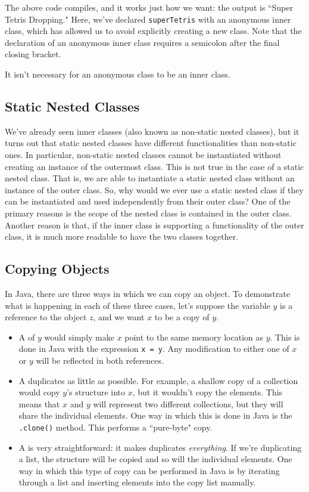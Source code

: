 The above code compiles, and it works just how we want: the output is ``Super Tetris Dropping." Here, we've declared \verb!superTetris! with an anonymous inner class, which has allowed us to avoid explicitly creating a new class. Note that the declaration of an anonymous inner class requires a semicolon after the final closing bracket. 

It isn't necessary for an anonymous class to be an inner class.

\subsection{Static Nested Classes}

We've already seen inner classes (also known as non-static nested classes), but it turns out that static nested classes have different functionalities than non-static ones. In particular, non-static nested classes cannot be instantiated without creating an instance of the outermost class. This is not true in the case of a static nested class. That is, we are able to instantiate a static nested class without an instance of the outer class. So, why would we ever use a static nested class if they can be instantiated and used independently from their outer class? One of the primary reasons is the scope of the nested class is contained in the outer class. Another reason is that, if the inner class is supporting a functionality of the outer class, it is much more readable to have the two classes together. 

\subsection{Copying Objects}
In Java, there are three ways in which we can copy an object. To demonstrate what is happening in each of these three cases, let's suppose the variable $y$ is a reference to the object $z$, and we want $x$ to be a copy of $y$.
\begin{itemize}
    \item A  of $y$ would simply make $x$ point to the same memory location as $y$. This is done in Java with the expression \verb!x = y!. Any modification to either one of $x$ or $y$ will be reflected in both references. 
    \item A  duplicates as little as possible. For example, a shallow copy of a collection would copy $y$'s structure into $x$, but it wouldn't copy the elements. This means that $x$ and $y$ will represent two different collections, but they will share the individual elements. One way in which this is done in Java is the \verb!.clone()! method. This performs a ``pure-byte" copy. 
    \item A  is very straightforward: it makes duplicates \textit{everything}. If we're duplicating a list, the structure will be copied and so will the individual elements. One way in which this type of copy can be performed in Java is by iterating through a list and inserting elements into the copy list manually. 
\end{itemize}


